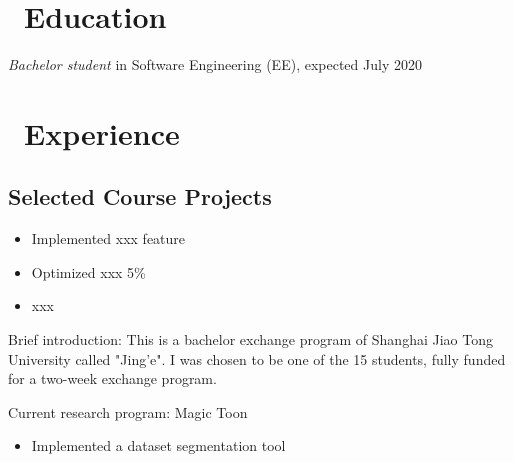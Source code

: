 \documentclass{resume}
\begin{document}




  
\section{\faGraduationCap\ Education}
\textit{Bachelor student} in Software Engineering (EE), expected July 2020

\section{\faUsers\ Experience}

\subsection{\textbf{Selected Course Projects}}
\begin{itemize}
  \item Implemented xxx feature
  \item Optimized xxx 5\%
  \item xxx
\end{itemize}

Brief introduction: This is a bachelor exchange program of Shanghai Jiao Tong University called "Jing'e". I was chosen to be one of the 15 students, fully funded for a two-week exchange program.



Current research program: Magic Toon
\begin{itemize}
  \item Implemented a dataset segmentation tool
\end{itemize}


\end{document}
